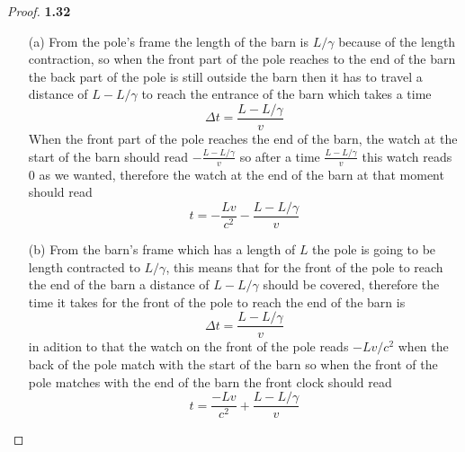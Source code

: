 \documentclass[11pt]{article}
\theoremstyle{definition}
\begin{document}
	\begin{proof}{\textbf{1.32}}
    \begin{itemize}
        \item [(a)] From the pole's frame the length of the barn is $L/\gamma$
        because of the length contraction, so when the front part of the pole 
        reaches to the end of the barn the back part of the pole is still outside
        the barn then it has to travel a distance of $L - L/\gamma$ to reach
        the entrance of the barn which takes a time
        $$\Delta t = \frac{L - L/\gamma}{v}$$
        When the front part of the pole reaches the end of the barn,
        the watch at the start of the barn should read $-\frac{L - L/\gamma}{v}$
        so after a time $\frac{L - L/\gamma}{v}$ this watch reads $0$ as we
        wanted, therefore the watch at the end of the barn at that moment
        should read
        $$t = -\frac{Lv}{c^2} -\frac{L - L/\gamma}{v}$$

        \item [(b)] From the barn's frame which has a length of $L$ the pole is
        going to be length contracted to $L/\gamma$, this means that for the
        front of the pole to reach the end of the barn a distance of
        $L - L/\gamma$ should be covered, therefore the time it takes for the
        front of the pole to reach the end of the barn is
        $$\Delta t = \frac{L - L/\gamma}{v}$$
        in adition to that the watch on the front of the pole reads $-Lv/c^2$
        when the back of the pole match with the start of the barn so when the
        front of the pole matches with the end of the barn the front clock
        should read
        $$t = \frac{-Lv}{c^2} + \frac{L - L/\gamma}{v}$$
    \end{itemize}
    \end{proof}
\end{document}
